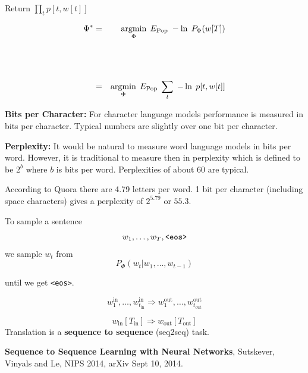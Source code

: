 {\vfill
Return $\prod_t p[t,w[t]]$


\begin{eqnarray*}
\Phi^* &  = & \operatorname*{argmin}_\Phi\; E_{\mathrm{Pop}} \;-\ln\;P_\Phi(w[T]) \\
\\
\\
\\
& = & \operatorname*{argmin}_\Phi\;E_{\mathrm{Pop}}\;\sum_t\; -\ln\;p[t,w[t]]
\end{eqnarray*}


{\bf Bits per Character:}
For character language models performance is measured in bits per character.  Typical numbers are slightly over one bit per character.

\vfill
{\bf Perplexity:}
It would be natural to measure word language models in bits per word.  However, it is traditional to measure then in perplexity which is defined to be
$2^b$ where $b$ is bits per word.  Perplexities of about 60 are typical.

\vfill
According to Quora there are 4.79 letters per word.  1 bit per character (including space characters) gives a perplexity of $2^{5.79}$ or $55.3$.


To sample a sentence
\vfill
$$w_1,\ldots, w_T, \mbox{\tt <eos>}$$
\vfill
we sample $w_t$ from
\vfill
$$P_\Phi(w_t|w_1,\ldots,w_{t-1})$$

\vfill
until we get {\tt <eos>}.





$$w^{\mathrm{in}}_1,\ldots,w^{\mathrm{in}}_{t_{\mathrm{in}}} \Rightarrow w^{\mathrm{out}}_1,\ldots,w^{\mathrm{out}}_{t_{\mathrm{out}}}$$

$$w_{\mathrm{in}}[T_{\mathrm{in}}] \Rightarrow w_{\mathrm{out}}[T_{\mathrm{out}}]$$
\vfill
Translation is a {\bf sequence to sequence} (seq2seq) task.

\vfill
{\bf Sequence to Sequence Learning with Neural Networks}, Sutskever, Vinyals and Le, NIPS 2014, arXiv Sept 10, 2014.



}
